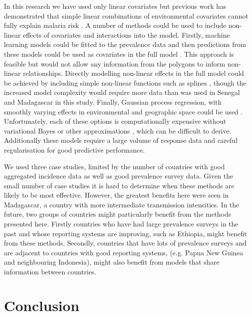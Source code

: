 \documentclass{statsoc}
\begin{document}
In this research we have used only linear covariates but previous work has demonstrated that simple linear combinations of environmental covariates cannot fully explain malaria risk \citep{bhatt2017improved}.
A number of methods could be used to include non-linear effects of covariates and interactions into the model.
Firstly, machine learning models could be fitted to the prevalence data and then predictions from these models could be used as covariates in the full model \citep{bhatt2017improved}.
This approach is feasible but would not allow any information from the polygons to inform non-linear relationships.
Directly modelling non-linear effects in the full model could be achieved by including simple non-linear functions such as splines \citep{sissoko2017temporal, sewe2017using, hundessa2018projecting}, though the increased model complexity would require more data than was used in Senegal and Madagascar in this study.
Finally, Gaussian process regression, with smoothly varying effects in environmental and geographic space could be used \citep{law2018variational}.
Unfortunately, each of these options is computationally expensive without variational Bayes or other approximations \citep{law2018variational, ton2018spatial}, which can be difficult to derive.
Additionally these models require a large volume of response data and careful regularisation for good predictive performance.

We used three case studies, limited by the number of countries with good aggregated incidence data as well as good prevalence survey data.
Given the small number of case studies it is hard to determine when these methods are likely to be most effective.
However, the greatest benefits here were seen in Madagascar, a country with more intermediate transmission intensities.
In the future, two groups of countries might particularly benefit from the methods presented here.
Firstly countries who have had large prevalence surveys in the past and whose reporting systems are improving, such as Ethiopia, might benefit from these methods.
Secondly, countries that have lots of prevalence surveys and are adjacent to countries with good reporting systems, (e.g. Papua New Guinea and neighbouring Indonesia), might also benefit from models that share information between countries.


\section*{Conclusion}
\end{document}
